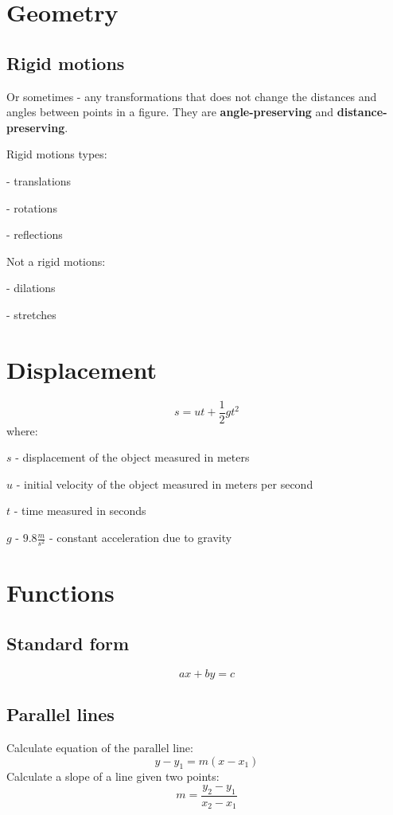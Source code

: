\documentclass{article}
\begin{document}
\section{Geometry}
\subsection{Rigid motions}
Or sometimes - any transformations that does not change the distances
and angles between points in a figure. They are \textbf{angle-preserving} and
\textbf{distance-preserving}.


Rigid motions types:

- translations

- rotations

- reflections


Not a rigid motions:

- dilations

- stretches

\section{Displacement}
\begin{equation}
  s = ut+\frac{1}{2}gt^2
\end{equation}
where:

$s$ - displacement of the object measured in meters

$u$ - initial velocity of the object measured in meters per second

$t$ - time measured in seconds

$g$ - $9.8\frac{m}{s^2}$ - constant acceleration due to gravity
\section{Functions}
\subsection{Standard form}
\begin{equation}
  ax + by = c
\end{equation}
\subsection{Parallel lines}
Calculate equation of the parallel line:
\begin{equation}
  y - y_1 = m(x - x_1)
\end{equation}
Calculate a slope of a line given two points:
\begin{equation}
  m = \frac{y_2 - y_1}{x_2 - x_1}
\end{equation}
\end{document}
